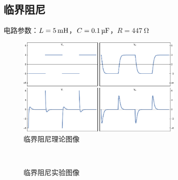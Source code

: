 \documentclass[a4paper,utf8]{article}
\begin{document}
    \subsection{临界阻尼}
    电路参数：$L= \SI{5}{\mH}$，$C= \SI{0.1}{\uF}$，$R=\SI{447}{\ohm}$
    \begin{figure}[!ht]
        \includegraphics[width=0.71\textwidth]{1l.pdf}
        \caption{临界阻尼理论图像}
    \end{figure}
    \begin{figure}[!ht]
        \hspace{6mm}
        \\
        \hspace{6mm}
        \caption{临界阻尼实验图像}
    \end{figure}\par
\end{document}
